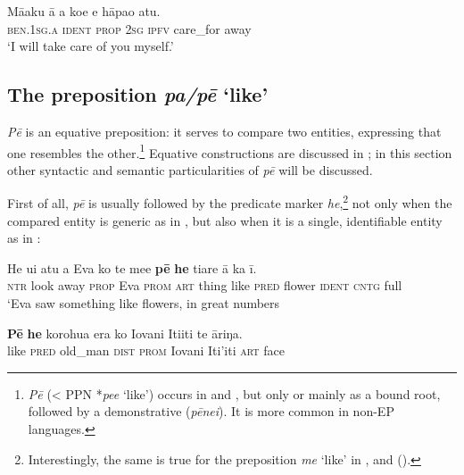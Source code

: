 \ea\label{ex:4.290}
\gll Mā{\ꞌ}aku {\ꞌ}ā a koe e hāpa{\ꞌ}o atu. \\
\textsc{ben.1sg.a} \textsc{ident} \textsc{prop} \textsc{2sg} \textsc{ipfv} care\_for away \\

\glt 
‘I will take care of you myself.’ \textstyleExampleref{[R310.067]} 
\z
{}
\subsection{The preposition \textit{pa/pē} ‘like’}\label{sec:4.7.8}
\textit{Pē} is an equative preposition: it serves to compare two entities, expressing that one resembles the other.\footnote{\label{fn:237}\textit{Pē} ({\textless} PPN *\textit{pee} ‘like’) occurs in  and , but only or mainly as a bound root, followed by a demonstrative (\textit{pēnei}). It is more common in non-EP languages.} Equative constructions are discussed in ; in this section other syntactic and semantic particularities of \textit{pē} will be discussed.

First of all, \textit{pē} is usually followed by the predicate marker \textit{he},\footnote{\label{fn:238}Interestingly, the same is true for the preposition \textit{me} ‘like’ in ,  and  ().}  not only when the compared entity is generic as in , but also when it is a single, identifiable entity as in :

\ea\label{ex:4.291}
\gll He u{\ꞌ}i atu a Eva ko te me{\ꞌ}e \textbf{pē} \textbf{he} tiare {\ꞌ}ā ka {\ꞌ}ī.\\
\textsc{ntr} look away \textsc{prop} Eva \textsc{prom} \textsc{art} thing like \textsc{pred} flower \textsc{ident} \textsc{cntg} full\\

\glt 
‘Eva saw something like flowers, in great numbers 
\z

\ea\label{ex:4.292}
\gll \textbf{Pē} \textbf{he} korohu{\ꞌ}a era ko Iovani {\ꞌ}Iti{\ꞌ}iti te {\ꞌ}āriŋa.\\
like \textsc{pred} old\_man \textsc{dist} \textsc{prom} Iovani Iti’iti \textsc{art} face\\

